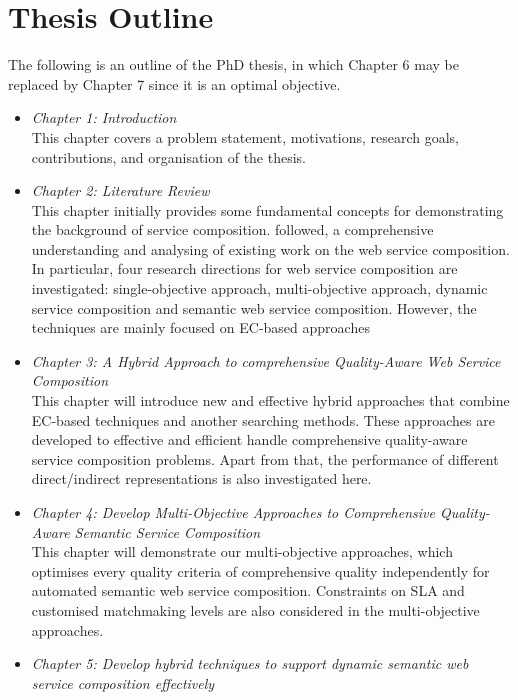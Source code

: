 \section{Thesis Outline}

The following is an outline of the PhD thesis,  in which Chapter 6 may be replaced by Chapter 7 since it is an optimal objective.

\begin{itemize}
 \item \textit{Chapter 1: Introduction}\\
 This chapter covers a problem statement, motivations, research goals, contributions, and organisation of the thesis.
 \item \textit{Chapter 2: Literature Review}\\
This chapter initially provides some fundamental concepts for demonstrating the background of service composition. followed, a comprehensive understanding and analysing of existing work on the web service composition.  In particular, four research directions for web service composition are investigated: single-objective approach, multi-objective approach, dynamic service composition and semantic web service composition.  However, the techniques are mainly focused on EC-based approaches
 \item \textit{Chapter 3: A Hybrid Approach to comprehensive Quality-Aware Web Service Composition}\\
This chapter will introduce new and effective hybrid approaches that combine EC-based techniques and another searching methods. These approaches are developed to effective and efficient handle comprehensive quality-aware service composition problems. Apart from that, the performance of different direct/indirect representations is also investigated here.
 \item \textit{Chapter 4: Develop Multi-Objective Approaches to Comprehensive Quality-Aware Semantic Service Composition}\\
This chapter will demonstrate our multi-objective approaches, which optimises every quality criteria of comprehensive quality independently for automated semantic web service composition. Constraints on SLA and customised matchmaking levels are also considered in the multi-objective approaches.
 \item \textit{Chapter 5: Develop hybrid techniques to support dynamic semantic web service composition effectively}\\

\end{itemize}
